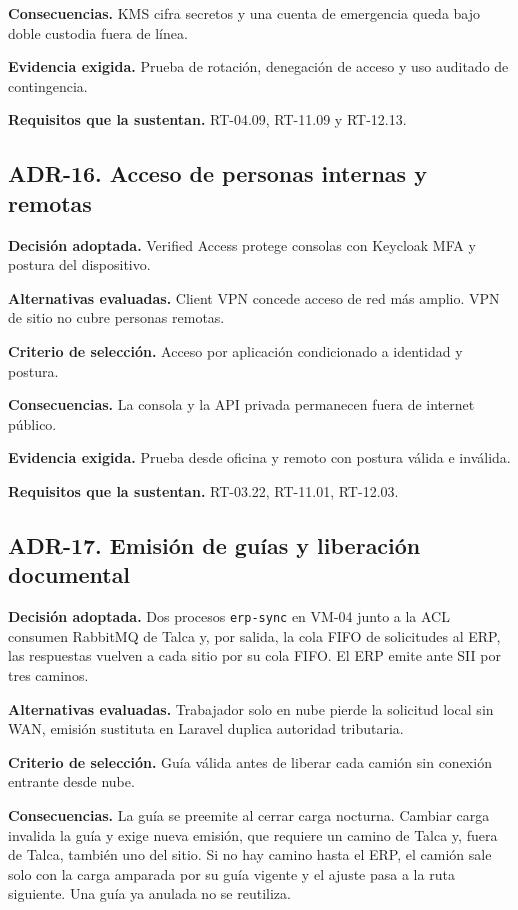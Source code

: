 \textbf{Consecuencias.} KMS cifra secretos y una cuenta de emergencia queda bajo doble custodia fuera de línea.

\textbf{Evidencia exigida.} Prueba de rotación, denegación de acceso y uso auditado de contingencia.

\textbf{Requisitos que la sustentan.} RT-04.09, RT-11.09 y RT-12.13.

\subsection*{ADR-16. Acceso de personas internas y remotas}
\label{sub:adr-16}
\textbf{Decisión adoptada.} Verified Access protege consolas con Keycloak MFA y postura del dispositivo.

\textbf{Alternativas evaluadas.} Client VPN concede acceso de red más amplio. VPN de sitio no cubre personas remotas.

\textbf{Criterio de selección.} Acceso por aplicación condicionado a identidad y postura.

\textbf{Consecuencias.} La consola y la API privada permanecen fuera de internet público.

\textbf{Evidencia exigida.} Prueba desde oficina y remoto con postura válida e inválida.

\textbf{Requisitos que la sustentan.} RT-03.22, RT-11.01, RT-12.03.

\subsection*{ADR-17. Emisión de guías y liberación documental}
\label{sub:adr-17}
\textbf{Decisión adoptada.} Dos procesos \texttt{erp-sync} en VM-04 junto a la ACL consumen RabbitMQ de Talca y, por salida, la cola FIFO de solicitudes al ERP, las respuestas vuelven a cada sitio por su cola FIFO. El ERP emite ante SII por tres caminos.

\textbf{Alternativas evaluadas.} Trabajador solo en nube pierde la solicitud local sin WAN, emisión sustituta en Laravel duplica autoridad tributaria.

\textbf{Criterio de selección.} Guía válida antes de liberar cada camión sin conexión entrante desde nube.

\textbf{Consecuencias.} La guía se preemite al cerrar carga nocturna. Cambiar carga invalida la guía y exige nueva emisión, que requiere un camino de Talca y, fuera de Talca, también uno del sitio. Si no hay camino hasta el ERP, el camión sale solo con la carga amparada por su guía vigente y el ajuste pasa a la ruta siguiente. Una guía ya anulada no se reutiliza.

